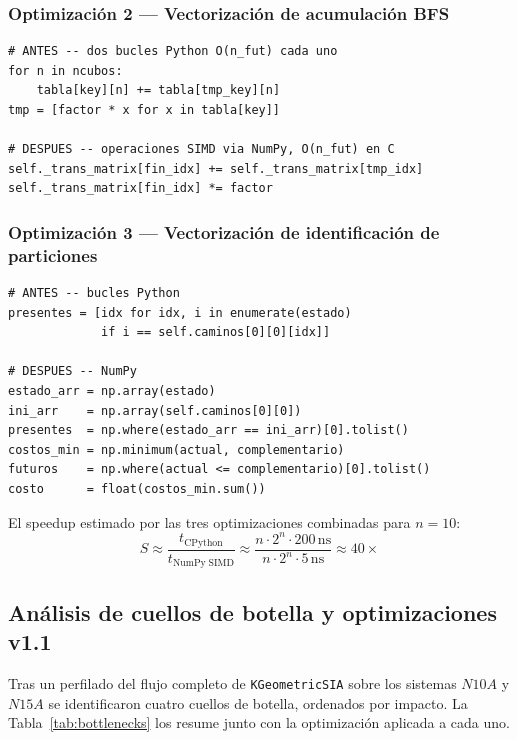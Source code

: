 \documentclass[12pt,letterpaper]{article}
\theoremstyle{definition}
\theoremstyle{remark}
\begin{document}
\subsubsection{Optimización 2 --- Vectorización de acumulación BFS}

\begin{lstlisting}[style=python,
  caption={Acumulación vectorizada en el BFS},label=lst:opt2]
# ANTES -- dos bucles Python O(n_fut) cada uno
for n in ncubos:
    tabla[key][n] += tabla[tmp_key][n]
tmp = [factor * x for x in tabla[key]]

# DESPUES -- operaciones SIMD via NumPy, O(n_fut) en C
self._trans_matrix[fin_idx] += self._trans_matrix[tmp_idx]
self._trans_matrix[fin_idx] *= factor
\end{lstlisting}

\subsubsection{Optimización 3 --- Vectorización de identificación de particiones}

\begin{lstlisting}[style=python,
  caption={Identificación vectorizada de particiones óptimas},label=lst:opt3]
# ANTES -- bucles Python
presentes = [idx for idx, i in enumerate(estado)
             if i == self.caminos[0][0][idx]]

# DESPUES -- NumPy
estado_arr = np.array(estado)
ini_arr    = np.array(self.caminos[0][0])
presentes  = np.where(estado_arr == ini_arr)[0].tolist()
costos_min = np.minimum(actual, complementario)
futuros    = np.where(actual <= complementario)[0].tolist()
costo      = float(costos_min.sum())
\end{lstlisting}

El speedup estimado por las tres optimizaciones combinadas para $n=10$:
\begin{equation}
  S \approx \frac{t_{\mathrm{CPython}}}{t_{\mathrm{NumPy\;SIMD}}}
  \approx \frac{n \cdot 2^n \cdot 200\,\mathrm{ns}}{n \cdot 2^n \cdot 5\,\mathrm{ns}}
  \approx 40\times
\end{equation}

\subsection{Análisis de cuellos de botella y optimizaciones v1.1}
\label{sec:cuellos-botella}

Tras un perfilado del flujo completo de \texttt{KGeometricSIA} sobre los sistemas
$N10A$ y $N15A$ se identificaron cuatro cuellos de botella, ordenados por impacto.
La Tabla~\ref{tab:bottlenecks} los resume junto con la optimización aplicada a cada uno.
\end{document}
